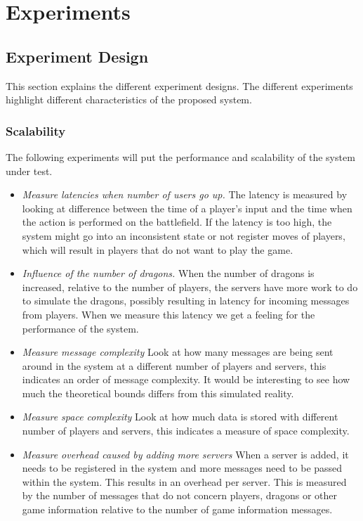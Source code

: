 \section{Experiments}
\label{chap:expresults}

\subsection{Experiment Design}
This section explains the different experiment designs. The different experiments highlight different characteristics of the proposed system.

\subsubsection{Scalability}
The following experiments will put the performance and scalability of the system under test.

\begin{itemize}
\item \emph{Measure latencies when number of users go up.} The latency is measured by looking at difference between the time of a player's input and the time when the action is performed on the battlefield. If the latency is too high, the system might go into an inconsistent state or not register moves of players, which will result in players that do not want to play the game. 
\item \emph{Influence of the number of dragons.} When the number of dragons is increased, relative to the number of players, the servers have more work to do to simulate the dragons, possibly resulting in latency for incoming messages from players. When we measure this latency we get a feeling for the performance of the system. 
\item \emph{Measure message complexity} Look at how many messages are being sent around in the system at a different number of players and servers, this indicates an order of message complexity. It would be interesting to see how much the theoretical bounds differs from this simulated reality.
\item \emph{Measure space complexity} Look at how much data is stored with different number of players and servers, this indicates a measure of space complexity. 
\item \emph{Measure overhead caused by adding more servers} When a server is added, it needs to be registered in the system and more messages need to be passed within the system. This results in an overhead per server. This is measured by the number of messages that do not concern players, dragons or other game information relative to the number of game information messages.
\end{itemize}

